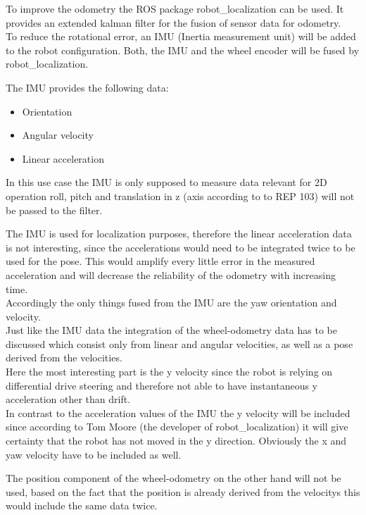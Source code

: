 To improve the odometry the ROS package robot\_localization can be used. It provides an extended kalman filter for the fusion of sensor data for odometry.\\

To reduce the rotational error, an IMU (Inertia measurement unit) will be added to the robot configuration. Both, the IMU and the wheel encoder will be fused by robot\_localization.

The IMU provides the following data:
\begin{itemize}
	\item Orientation
	\item Angular velocity
	\item Linear acceleration
\end{itemize}

In this use case the IMU is only supposed to measure data relevant for 2D operation roll, pitch and translation in z (axis according to to REP 103) will not be passed to the filter. 

The IMU is used for localization purposes, therefore the linear acceleration data is not interesting, since the accelerations would need to be integrated twice to be used for the pose. This would amplify every little error in the measured acceleration and will decrease the reliability of the odometry with increasing time.\\

Accordingly the only things fused from the IMU are the yaw orientation and velocity.\\

Just like the IMU data the integration of the wheel-odometry data has to be discussed which consist only from linear and angular velocities, as well as a pose derived from the velocities.\\

Here the most interesting part is the y velocity since the robot is relying on differential drive steering and therefore not able to have instantaneous y acceleration other than drift.\\

In contrast to the acceleration values of the IMU the y velocity will be included since according to Tom Moore (the developer of robot\_localization) it will give certainty that the robot has not moved in the y direction\cite{robotlocalizationconfiguration}. Obviously the x and yaw velocity have to be included as well.

The position component of the wheel-odometry on the other hand will not be used, based on the fact that the position is already derived from the velocitys this would include the same data twice.\\

